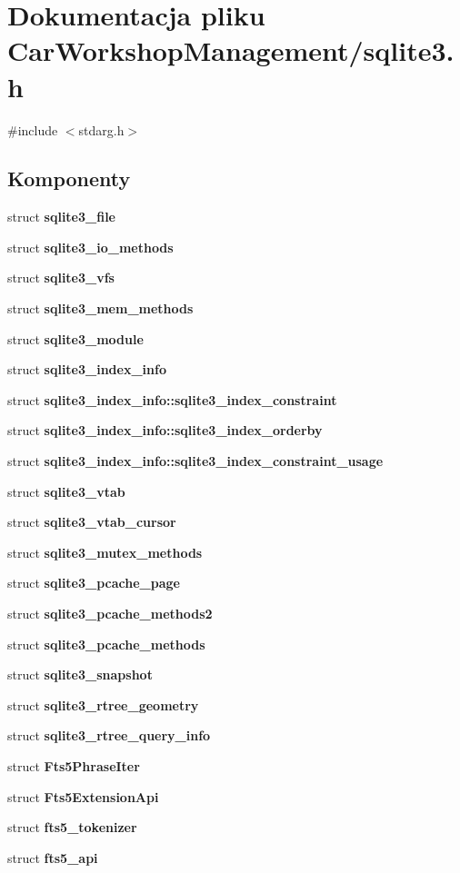 \section{Dokumentacja pliku Car\+Workshop\+Management/sqlite3.h}
\label{sqlite3_8h}
{\ttfamily \#include $<$stdarg.\+h$>$}\newline
\subsection*{Komponenty}
\begin{DoxyCompactItemize}
\item 
struct \textbf{ sqlite3\+\_\+file}
\item 
struct \textbf{ sqlite3\+\_\+io\+\_\+methods}
\item 
struct \textbf{ sqlite3\+\_\+vfs}
\item 
struct \textbf{ sqlite3\+\_\+mem\+\_\+methods}
\item 
struct \textbf{ sqlite3\+\_\+module}
\item 
struct \textbf{ sqlite3\+\_\+index\+\_\+info}
\item 
struct \textbf{ sqlite3\+\_\+index\+\_\+info\+::sqlite3\+\_\+index\+\_\+constraint}
\item 
struct \textbf{ sqlite3\+\_\+index\+\_\+info\+::sqlite3\+\_\+index\+\_\+orderby}
\item 
struct \textbf{ sqlite3\+\_\+index\+\_\+info\+::sqlite3\+\_\+index\+\_\+constraint\+\_\+usage}
\item 
struct \textbf{ sqlite3\+\_\+vtab}
\item 
struct \textbf{ sqlite3\+\_\+vtab\+\_\+cursor}
\item 
struct \textbf{ sqlite3\+\_\+mutex\+\_\+methods}
\item 
struct \textbf{ sqlite3\+\_\+pcache\+\_\+page}
\item 
struct \textbf{ sqlite3\+\_\+pcache\+\_\+methods2}
\item 
struct \textbf{ sqlite3\+\_\+pcache\+\_\+methods}
\item 
struct \textbf{ sqlite3\+\_\+snapshot}
\item 
struct \textbf{ sqlite3\+\_\+rtree\+\_\+geometry}
\item 
struct \textbf{ sqlite3\+\_\+rtree\+\_\+query\+\_\+info}
\item 
struct \textbf{ Fts5\+Phrase\+Iter}
\item 
struct \textbf{ Fts5\+Extension\+Api}
\item 
struct \textbf{ fts5\+\_\+tokenizer}
\item 
struct \textbf{ fts5\+\_\+api}
\end{DoxyCompactItemize}
